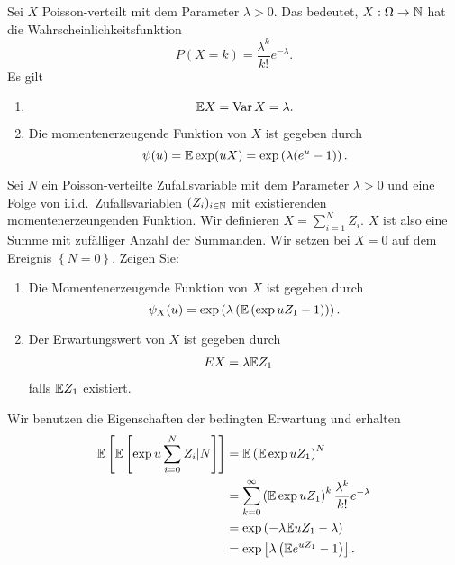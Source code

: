 Sei $X$ Poisson-verteilt mit dem Parameter $\lambda>0$. Das bedeutet, $X:\Omega\to\mathbb N$
hat die Wahrscheinlichkeitsfunktion 
\begin{equation*}
    P(X = k) = \frac{\lambda^{k}}{k!} e^{-\lambda}.
\end{equation*}
Es gilt
\begin{enumerate}
    \item 
        \begin{equation*}
            \mathbb{E} X = \operatorname{Var} X = \lambda.
        \end{equation*}
    \item Die momentenerzeugende Funktion von $X$ ist gegeben durch
        \begin{equation*}
            \psi(u) = \mathbb{E} \exp(uX) = \exp \left( \lambda(e^u - 1) \right).
        \end{equation*}
\end{enumerate}

Sei $N$ ein Poisson-verteilte Zufallsvariable mit dem Parameter $\lambda>0$ und
eine Folge von i.i.d.\ Zufallsvariablen $(Z_i)_{i\in\mathbb N}$ mit existierenden
momentenerzeungenden Funktion. Wir definieren $X = \sum_{i=1}^{N} Z_i$. $X$ ist
also eine Summe mit zufälliger Anzahl der Summanden. Wir setzen bei $X=0$ auf
dem Ereignis $\left\{ N=0 \right\}$. Zeigen Sie:
\begin{enumerate}
    \item Die Momentenerzeugende Funktion von $X$ ist gegeben durch
        \begin{equation*}
            \psi_X(u) = \exp \left( \lambda \left( 
            \mathbb{E} \left( \exp uZ_1 -1 \right)
            \right) \right).
        \end{equation*}
    \item Der Erwartungswert von $X$ ist gegeben durch
        \begin{align*}
            E X &= \lambda \mathbb{E} Z_1 
        \end{align*}
        falls $\mathbb{E} Z_1$ existiert. 
\end{enumerate}

\solution Wir benutzen die Eigenschaften der bedingten Erwartung und erhalten
\begin{align*}
    \mathbb{E} \left[ \mathbb{E} \left[ \exp u \sum_{i=0}^{N} Z_i | N \right] \right] &= 
    \mathbb{E} \left( \mathbb{E} \exp uZ_1 \right)^N \\
    &= \sum_{k=0}^{\infty} \left( \mathbb{E} \exp u Z_1 \right)^k \frac{\lambda^k}{k!} e^{-\lambda} \\
    &= \exp \left( -\lambda \mathbb{E} u Z_1  - \lambda\right)  \\
    &= \exp \left[  \lambda\left( \mathbb{E} e^{uZ_1} -1 \right)  \right].
\end{align*}


